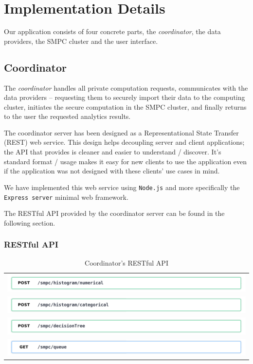 \chapter{Implementation Details}\label{c:implementation}

Our application consists of four concrete parts, the \textit{coordinator}, the data providers, the SMPC cluster and the user interface.

\section{Coordinator}\label{s:impl-coordinator}
The \textit{coordinator} handles all private computation requests, communicates with the data providers -- requesting them to securely import their data to the computing cluster, initiates the secure computation in the SMPC cluster, and finally returns to the user the requested analytics results.

The coordinator server has been designed as a Representational State Transfer (REST) web service.
This design helps decoupling server and client applications; the API that provides is cleaner and easier to understand / discover.
It's standard format / usage makes it easy for new clients to use the application even if the application was not designed with these clients' use cases in mind.

We have implemented this web service using \texttt{Node.js} and more specifically the \texttt{Express server} minimal web framework.

The RESTful API provided by the coordinator server can be found in the following section.


\subsection{RESTful API}\label{ss:coord-restful-api}

\begin{table}[H]
  \centering
  \caption{Coordinator's RESTful API}
  \label{t:coordinator-api}
\begin{tabular}{l}
  \includegraphics[page=1,width=\textwidth]{figures/post1.pdf} \\
  \includegraphics[page=1,width=\textwidth]{figures/post2.pdf} \\
  \includegraphics[page=1,width=\textwidth]{figures/post3.pdf} \\
  \includegraphics[page=1,width=\textwidth]{figures/get1.pdf} \\
\end{tabular}
\end{table}


